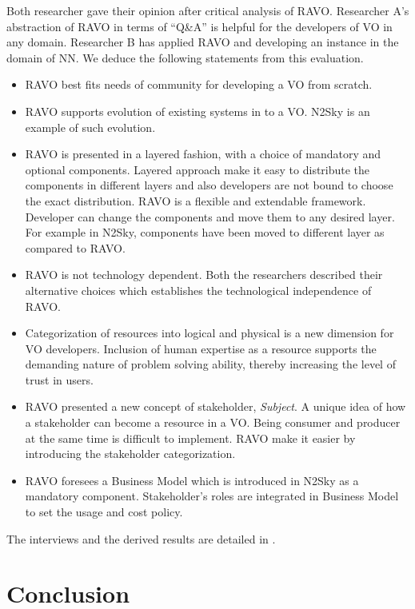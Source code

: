 \documentclass[]{article}
\begin{document}
Both researcher gave their opinion after critical analysis of RAVO. Researcher A's abstraction of RAVO in terms of ``Q\&A'' is helpful for the developers of VO in any domain. Researcher B has applied RAVO and developing an instance in the domain of NN. We deduce the following statements from this evaluation.

\begin{itemize}
\item RAVO best fits needs of community for developing a VO from scratch.
\item RAVO supports evolution of existing systems in to a VO. N2Sky is an example of such evolution.
\item RAVO is presented in a layered fashion, with a choice of mandatory and optional components. Layered approach make it easy to distribute the components in different layers and also developers are not bound to choose the exact distribution. RAVO is a flexible and extendable framework. Developer can change the components and move them to any desired layer. For example in N2Sky, components have been moved to different layer as compared to RAVO.
\item RAVO is not technology dependent. Both the researchers described their alternative choices which establishes the technological independence of RAVO.
\item Categorization of resources into logical and physical is a new dimension for VO developers. Inclusion of human expertise as a resource supports the demanding nature of problem solving ability, thereby increasing the level of trust in users.
\item RAVO presented a new concept of stakeholder, \emph{Subject}. A unique idea of how a stakeholder can become a resource in a VO. Being consumer and producer at the same time is difficult to implement. RAVO make it easier by introducing the stakeholder categorization.
\item RAVO foresees a Business Model which is introduced in N2Sky as a mandatory component. Stakeholder's roles are integrated in Business Model to set the usage and cost policy.

\end{itemize}

The interviews and the derived results are detailed in \cite{wajeehaphd12}.


\section{Conclusion}
\end{document}
